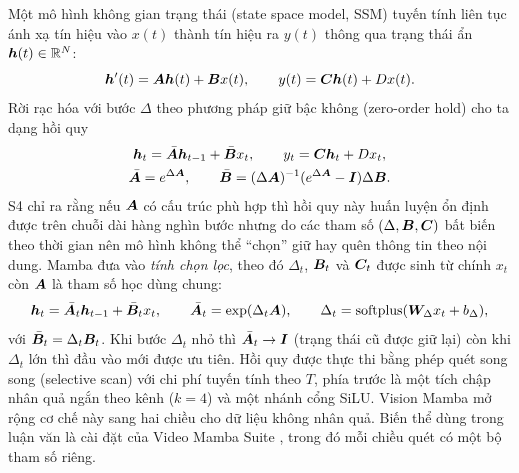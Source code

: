 Một mô hình không gian trạng thái (state space model, SSM) tuyến tính liên tục ánh xạ tín hiệu vào $x(t)$ thành tín hiệu ra $y(t)$ thông qua trạng thái ẩn $\bm{h}(t) \in \mathbb{R}^{N}$:
\begin{equation}
\bm{h}'(t) = \bm{A}\bm{h}(t) + \bm{B}x(t), \qquad y(t) = \bm{C}\bm{h}(t) + Dx(t).
\label{eq:ssm-cont}
\end{equation}
Rời rạc hóa với bước $\Delta$ theo phương pháp giữ bậc không (zero-order hold) cho ta dạng hồi quy
\begin{equation}
\begin{gathered}
\bm{h}_t = \bar{\bm{A}}\bm{h}_{t-1} + \bar{\bm{B}}x_t, \qquad y_t = \bm{C}\bm{h}_t + Dx_t,\\
\bar{\bm{A}} = e^{\Delta\bm{A}}, \qquad \bar{\bm{B}} = (\Delta\bm{A})^{-1}(e^{\Delta\bm{A}} - \bm{I})\Delta\bm{B}.
\end{gathered}
\label{eq:ssm-disc}
\end{equation}
S4 \cite{gu2022s4} chỉ ra rằng nếu $\bm{A}$ có cấu trúc phù hợp thì hồi quy này huấn luyện ổn định được trên chuỗi dài hàng nghìn bước nhưng do các tham số $(\Delta, \bm{B}, \bm{C})$ bất biến theo thời gian nên mô hình không thể ``chọn'' giữ hay quên thông tin theo nội dung. Mamba \cite{gu2023mamba} đưa vào \emph{tính chọn lọc}, theo đó $\Delta_t$, $\bm{B}_t$ và $\bm{C}_t$ được sinh từ chính $x_t$ còn $\bm{A}$ là tham số học dùng chung:
\begin{equation}
\bm{h}_t = \bar{\bm{A}}_t\bm{h}_{t-1} + \bar{\bm{B}}_t x_t, \qquad
\bar{\bm{A}}_t = \exp(\Delta_t\bm{A}), \qquad
\Delta_t = \mathrm{softplus}(\bm{W}_\Delta x_t + b_\Delta),
\label{eq:mamba}
\end{equation}
với $\bar{\bm{B}}_t = \Delta_t\bm{B}_t$. Khi bước $\Delta_t$ nhỏ thì $\bar{\bm{A}}_t \to \bm{I}$ (trạng thái cũ được giữ lại) còn khi $\Delta_t$ lớn thì đầu vào mới được ưu tiên. Hồi quy được thực thi bằng phép quét song song (selective scan) với chi phí tuyến tính theo $T$, phía trước là một tích chập nhân quả ngắn theo kênh ($k = 4$) và một nhánh cổng SiLU. Vision Mamba \cite{zhu2024vim} mở rộng cơ chế này sang hai chiều cho dữ liệu không nhân quả. Biến thể  dùng trong luận văn là cài đặt của Video Mamba Suite \cite{chen2024videomambasuite}, trong đó mỗi chiều quét có một bộ tham số riêng.


